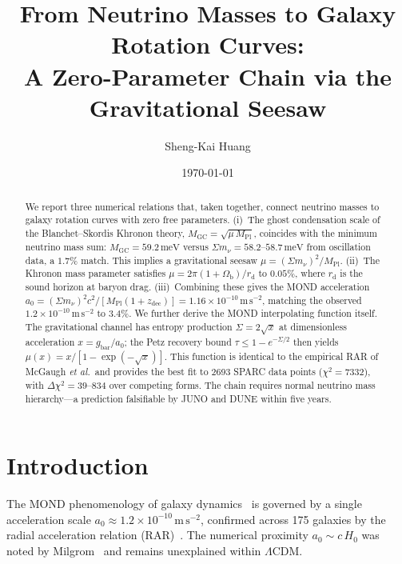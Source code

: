 \documentclass[prl,twocolumn,superscriptaddress,longbibliography]{revtex4-2}
\newcommand{\meV}{\,\mathrm{meV}}
\newcommand{\ms}{\,\mathrm{m\,s}^{-2}}
\newcommand{\zdec}{z_{\mathrm{dec}}}
\newcommand{\rd}{r_{\mathrm{d}}}
\newcommand{\Ob}{\Omega_{\mathrm{b}}}
\newcommand{\MPl}{M_{\mathrm{Pl}}}
\newcommand{\MGC}{M_{\mathrm{GC}}}
\newcommand{\azero}{a_0}
\newcommand{\sumnu}{\Sigma m_\nu}
\begin{document}
\title{From Neutrino Masses to Galaxy Rotation Curves:\\
A Zero-Parameter Chain via the Gravitational Seesaw}

\author{Sheng-Kai Huang}

\date{\today}

\begin{abstract}
We report three numerical relations that, taken together, connect
neutrino masses to galaxy rotation curves with zero free parameters.
(i)~The ghost condensation scale of the Blanchet--Skordis Khronon
theory, $\MGC = \sqrt{\mu\,\MPl}$, coincides with the minimum
neutrino mass sum: $\MGC = 59.2\meV$ versus
$\sumnu = 58.2$--$58.7\meV$ from oscillation data, a
$1.7\%$ match.
This implies a gravitational seesaw $\mu = (\sumnu)^2/\MPl$.
(ii)~The Khronon mass parameter satisfies
$\mu = 2\pi(1+\Ob)/\rd$ to $0.05\%$,
where $\rd$ is the sound horizon at baryon drag.
(iii)~Combining these gives the MOND acceleration
$\azero = (\sumnu)^2 c^2/[\MPl(1+\zdec)]
= 1.16 \times 10^{-10}\ms$,
matching the observed $1.2 \times 10^{-10}\ms$ to $3.4\%$.
We further derive the MOND interpolating function itself.
The gravitational channel has entropy production
$\Sigma = 2\sqrt{x}$ at dimensionless acceleration
$x = g_{\mathrm{bar}}/\azero$;
the Petz recovery bound $\tau \leq 1 - e^{-\Sigma/2}$
then yields $\mu(x) = x/[1 - \exp(-\sqrt{x})]$.
This function is identical to the empirical RAR
of McGaugh \textit{et al.}\ and provides the best fit to
2693 SPARC data points ($\chi^2 = 7332$), with $\Delta\chi^2 = 39$--$834$
over competing forms.
The chain requires normal neutrino mass hierarchy---a prediction
falsifiable by JUNO and DUNE within five years.
\end{abstract}

\maketitle

\section{Introduction}

The MOND phenomenology of galaxy dynamics~\cite{Milgrom1983}
is governed by a single acceleration scale
$\azero \approx 1.2 \times 10^{-10}\ms$,
confirmed across 175 galaxies by the radial acceleration
relation (RAR)~\cite{McGaugh2016,Lelli2017}.
The numerical proximity $\azero \sim c\,H_0$ was noted
by Milgrom~\cite{Milgrom1983} and remains unexplained
within $\Lambda$CDM.
\end{document}
